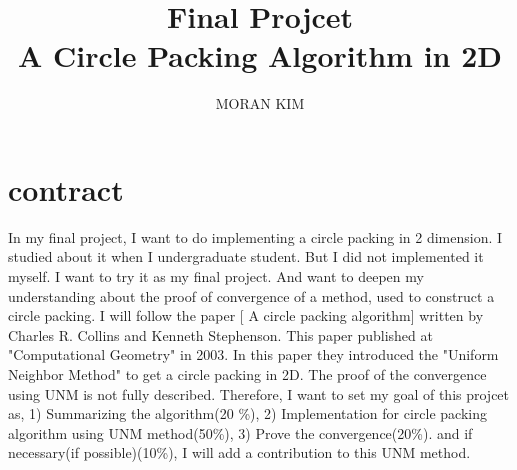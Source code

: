 \documentclass{SOP_KimMoran}
\begin{document}
\title[Final Projcet]
{Final Projcet\\ A Circle Packing Algorithm in 2D}


\author{MORAN KIM}
\address{Department of Mathematics\\
  Ewha Womans University\\South Korea}

\maketitle
\section{contract}
In my final project, I want to do implementing a circle packing in 2 dimension. I studied about it when I undergraduate student. But I did not implemented it myself. I want to try it as my final project. And want to deepen my understanding about the proof of convergence of a method, used to construct a circle packing. I will follow the paper [ A circle packing algorithm] written by Charles R. Collins and  Kenneth Stephenson. This paper published at "Computational Geometry" in 2003. In this paper they introduced the "Uniform Neighbor Method" to get a circle packing in 2D. The proof of the convergence using UNM is not fully described. Therefore, I want to set my goal of this projcet as, 1) Summarizing the algorithm(20 \%), 2) Implementation for circle packing algorithm using UNM method(50\%), 3) Prove the convergence(20\%). and if necessary(if possible)(10\%), I will add a contribution to this UNM method.
\end{document}
